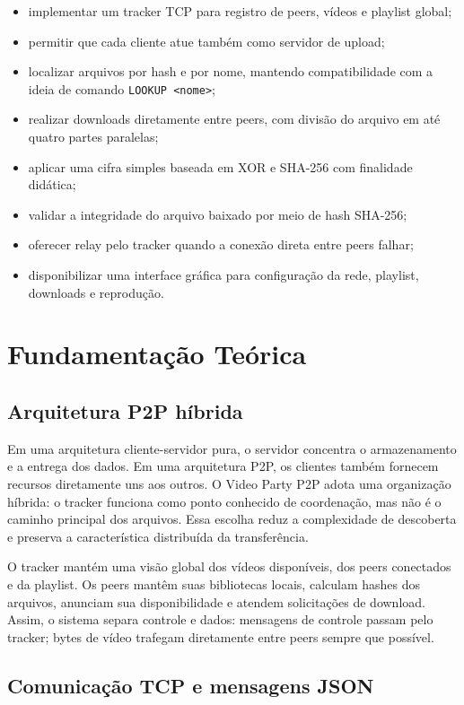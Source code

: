 \documentclass[
	12pt,
	oneside,
	a4paper,
	chapter=TITLE,
	section=TITLE,
	english,
	brazilian,
	sumario=tradicional
]{abntex2}
\begin{document}
\begin{itemize}
	\item implementar um tracker TCP para registro de peers, vídeos e playlist global;
	\item permitir que cada cliente atue também como servidor de upload;
	\item localizar arquivos por hash e por nome, mantendo compatibilidade com a ideia de comando \texttt{LOOKUP <nome>};
	\item realizar downloads diretamente entre peers, com divisão do arquivo em até quatro partes paralelas;
	\item aplicar uma cifra simples baseada em XOR e SHA-256 com finalidade didática;
	\item validar a integridade do arquivo baixado por meio de hash SHA-256;
	\item oferecer relay pelo tracker quando a conexão direta entre peers falhar;
	\item disponibilizar uma interface gráfica para configuração da rede, playlist, downloads e reprodução.
\end{itemize}

\section{Fundamentação Teórica}

\subsection{Arquitetura P2P híbrida}

Em uma arquitetura cliente-servidor pura, o servidor concentra o armazenamento e a entrega dos dados. Em uma arquitetura P2P, os clientes também fornecem recursos diretamente uns aos outros. O Video Party P2P adota uma organização híbrida: o tracker funciona como ponto conhecido de coordenação, mas não é o caminho principal dos arquivos. Essa escolha reduz a complexidade de descoberta e preserva a característica distribuída da transferência.

O tracker mantém uma visão global dos vídeos disponíveis, dos peers conectados e da playlist. Os peers mantêm suas bibliotecas locais, calculam hashes dos arquivos, anunciam sua disponibilidade e atendem solicitações de download. Assim, o sistema separa controle e dados: mensagens de controle passam pelo tracker; bytes de vídeo trafegam diretamente entre peers sempre que possível.

\subsection{Comunicação TCP e mensagens JSON}
\end{document}
